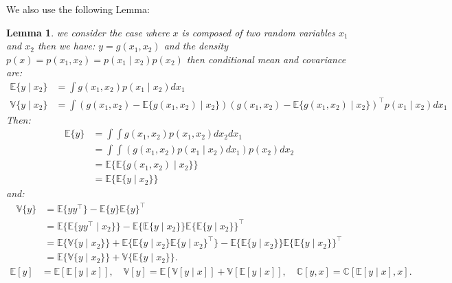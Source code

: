 \documentclass[dissertation,math,vertlayout,pdfa,colorlinks,nologo]{aaltoseries}
\newtheorem{lemma}{Lemma}
\begin{document}
We also use the following Lemma:
\begin{lemma}
we consider the case where $x$ is composed of two random variables $x_1$ and $x_2$ then we have: $y=g(x_1,x_2)$ and the density $p(x) = p(x_1,x_2) = p(x_1 \mid x_2)p(x_2)$ then conditional mean and covariance are:
\begin{equation}
\begin{split}
    \mathbb{E}\{y\mid x_2\} &= \int g(x_1,x_2)p(x_1 \mid x_2)dx_1\\
    \mathbb{V}\{y\mid x_2\} &= \int (g(x_1,x_2) - \mathbb{E}\{g(x_1,x_2)\mid x_2\})(g(x_1,x_2) - \mathbb{E}\{g(x_1,x_2)\mid x_2\})^\top p(x_1 \mid x_2)dx_1
    \end{split}
\end{equation}
Then:
\begin{equation}
    \begin{split}
        \mathbb{E}\{y\} &= \int \int g(x_1,x_2)p(x_1,x_2)dx_2dx_1\\
        &= \int \int (g(x_1,x_2)p(x_1\mid x_2)dx_1)p(x_2)dx_2\\
        &=\mathbb{E}\{\mathbb{E}\{g(x_1,x_2)\mid x_2\}\}\\
        &=\mathbb{E}\{\mathbb{E}\{y\mid x_2\}\}
    \end{split}
\end{equation}
and:
\begin{equation}
    \begin{split}
     \mathbb{V}\{y\} &= \mathbb{E}\{yy^\top\} - \mathbb{E}\{y\}\mathbb{E}\{y\}^\top\\
     &= \mathbb{E}\{\mathbb{E}\{yy^\top \mid x_2\}\} - \mathbb{E}\{\mathbb{E}\{y\mid x_2\}\}\mathbb{E}\{\mathbb{E}\{y \mid x_2\}\}^\top\\
     &=\mathbb{E}\{\mathbb{V}\{y\mid x_2\}\} + \mathbb{E}\{\mathbb{E}\{y\mid x_2\}\mathbb{E}\{y\mid x_2\}^\top\}-\mathbb{E}\{\mathbb{E}\{y\mid x_2\}\}\mathbb{E}\{\mathbb{E}\{y\mid x_2 \}\}^\top\\
     &= \mathbb{E}\{\mathbb{V}\{y\mid x_2\}\}+\mathbb{V}\{\mathbb{E}\{y\mid x_2\}\}.
    \end{split}
\end{equation}
    \begin{equation}\label{eq:GSLR-moments}%
            \begin{split}
                \mathbb{E}[y] &=\mathbb{E}[\mathbb{E}[y\mid x]], \quad \mathbb{V}[y] = \mathbb{E}[\mathbb{V}[y\mid x]]+\mathbb{V}[\mathbb{E}[y\mid x]],\quad \mathbb{C}[y, x] =  \mathbb{C} [\mathbb{E}[y \mid x], x].
            \end{split}
        \end{equation}
\end{lemma}
\end{document}

